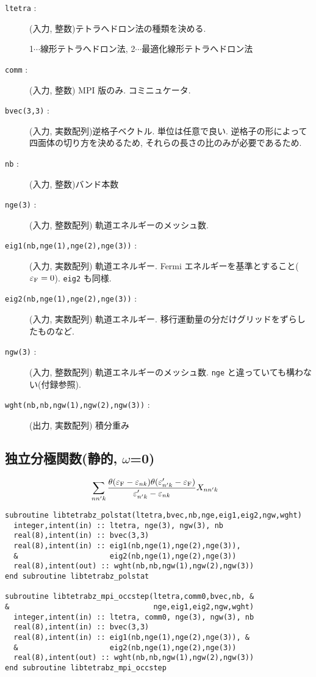 \documentclass[12pt]{jarticle}
\begin{document}
\begin{description}
\item[\texttt{ltetra} : ] (入力, 整数)テトラへドロン法の種類を決める. 
 
  1$\cdots$線形テトラへドロン法, 2$\cdots$最適化線形テトラへドロン法
\item[\texttt{comm} : ] (入力, 整数) MPI 版のみ. コミニュケータ. 
\item[\texttt{bvec(3,3)} : ] (入力, 実数配列)逆格子ベクトル. 単位は任意で良い. 
  逆格子の形によって四面体の切り方を決めるため, それらの長さの比のみが必要であるため. 
\item[\texttt{nb} : ] (入力, 整数)バンド本数
\item[\texttt{nge(3)} : ] (入力, 整数配列) 軌道エネルギーのメッシュ数. 
\item[\texttt{eig1(nb,nge(1),nge(2),nge(3))} : ] (入力, 実数配列) 軌道エネルギー. 
  Fermi エネルギーを基準とすること($\varepsilon_{\rm F}=0$). \verb|eig2| も同様. 
\item[\texttt{eig2(nb,nge(1),nge(2),nge(3))} : ] (入力, 実数配列) 軌道エネルギー. 
  移行運動量の分だけグリッドをずらしたものなど. 
\item[\texttt{ngw(3)} : ] (入力, 整数配列) 軌道エネルギーのメッシュ数. 
  \verb|nge| と違っていても構わない(付録参照). 
\item[\texttt{wght(nb,nb,ngw(1),ngw(2),ngw(3))} : ] (出力, 実数配列) 積分重み
\end{description}

\newpage

\subsection{独立分極関数(静的, $\omega$=0)}

\begin{align}
&\sum_{n n' k} \frac{\theta(\varepsilon_{\rm F} - \varepsilon_{n k})
  \theta(\varepsilon'_{n' k} - \varepsilon_{\rm F})}
    {\varepsilon'_{n' k} - \varepsilon_{n k}} X_{n n' k}
\end{align}

\begin{verbatim}
subroutine libtetrabz_polstat(ltetra,bvec,nb,nge,eig1,eig2,ngw,wght)
  integer,intent(in) :: ltetra, nge(3), ngw(3), nb
  real(8),intent(in) :: bvec(3,3)
  real(8),intent(in) :: eig1(nb,nge(1),nge(2),nge(3)),
  &                     eig2(nb,nge(1),nge(2),nge(3))
  real(8),intent(out) :: wght(nb,nb,ngw(1),ngw(2),ngw(3))
end subroutine libtetrabz_polstat

subroutine libtetrabz_mpi_occstep(ltetra,comm0,bvec,nb, &
&                                 nge,eig1,eig2,ngw,wght)
  integer,intent(in) :: ltetra, comm0, nge(3), ngw(3), nb
  real(8),intent(in) :: bvec(3,3)
  real(8),intent(in) :: eig1(nb,nge(1),nge(2),nge(3)), &
  &                     eig2(nb,nge(1),nge(2),nge(3))
  real(8),intent(out) :: wght(nb,nb,ngw(1),ngw(2),ngw(3))
end subroutine libtetrabz_mpi_occstep
\end{verbatim}
\end{document}
